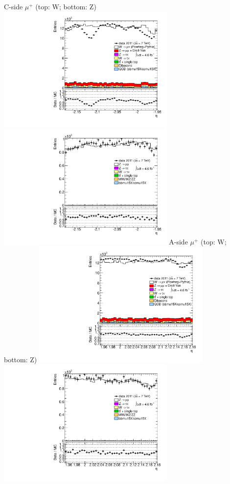  {
\colb[T]
C-side $\mu^{+}$ (top: W; bottom: Z)
\centering
\includegraphics[width=0.66\textwidth]{dates/20130306/figures/both/W_10_C_stack_l_eta_POS} \\
\includegraphics[width=0.66\textwidth]{dates/20130306/figures/both/Z_10_C_stack_lP_eta_ALL.pdf}
A-side $\mu^{+}$ (top: W; bottom: Z)
\centering
\includegraphics[width=0.66\textwidth]{dates/20130306/figures/both/W_10_A_stack_l_eta_POS} \\
\includegraphics[width=0.66\textwidth]{dates/20130306/figures/both/Z_10_A_stack_lP_eta_ALL.pdf} 
\cole
}
